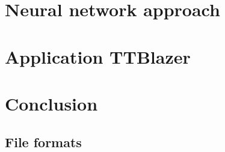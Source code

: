 \documentclass[a4paper]{article}
\numberwithin{algorithm}{section}
\numberwithin{figure}{section}
\numberwithin{table}{section}
\numberwithin{equation}{section}
\begin{document}
    \section{Neural network approach}
    \label{sec:neural}
    
    \pagebreak
    
    \section{Application TTBlazer}
    \label{sec:ttblazer}
    
    \pagebreak

    \section{Conclusion}
    \label{sec:concl}
    
    \pagebreak
    
    \begin{appendices}
  		\section{File formats}
  		\label{app:formats}
  		
	\end{appendices}
	\pagebreak



    
    {}
\end{document}

